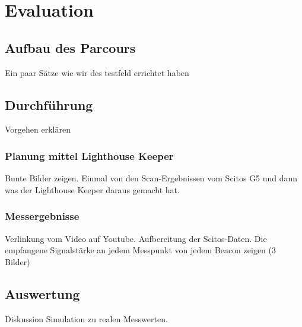 \chapter{Evaluation}

\section{Aufbau des Parcours}
Ein paar Sätze wie wir des testfeld errichtet haben 

\section{Durchführung}
Vorgehen erklären
\subsection{Planung mittel Lighthouse Keeper}
Bunte Bilder zeigen. Einmal von den Scan-Ergebnissen vom Scitos G5 und dann was der Lighthouse Keeper daraus gemacht hat.
\subsection{Messergebnisse}
Verlinkung vom Video auf Youtube. Aufbereitung der Scitos-Daten. Die empfangene Signalstärke an jedem Messpunkt von jedem Beacon zeigen (3 Bilder)

\section{Auswertung}
Diskussion Simulation zu realen Messwerten.

